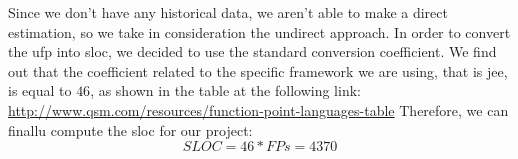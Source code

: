 Since we don't have any historical data, we aren't able to make a direct estimation, so we take in consideration the undirect approach.
In order to convert the \acs{ufp} into \acs{sloc}, we decided to use the standard conversion coefficient. We find out that the coefficient related to the specific framework we are using, that is \acs{jee}, is equal to $46$, as shown in the table at the following link: \url{http://www.qsm.com/resources/function-point-languages-table}
Therefore, we can finallu compute the \acs{sloc} for our project:
\[SLOC = 46 * FPs = 4370\]